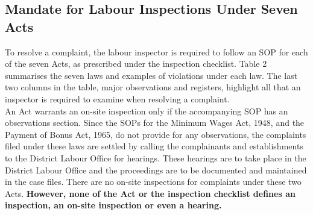 \documentclass[a4paper, 12pt, twoside]{article}
\begin{document}
\subsection{Mandate for Labour Inspections Under Seven Acts}
To resolve a complaint, the labour inspector is required to follow an SOP for each of the seven Acts, as prescribed under the inspection checklist. Table 2 summarises the seven laws and examples of violations under each law. The last two columns in the table, major observations and registers, highlight all that an inspector is required to examine when resolving a complaint. \\

An Act warrants an on-site inspection only if the accompanying SOP has an observations section. Since the SOPs for the Minimum Wages Act, 1948, and the Payment of Bonus Act, 1965, do not provide for any observations, the complaints filed under these laws are settled by calling the complainants and establishments to the District Labour Office for hearings. These hearings are to take place in the District Labour Office and the proceedings are to be documented and maintained in the case files. There are no on-site inspections for complaints under these two Acts. \textbf{However, none of the Act or the inspection checklist defines an inspection, an on-site inspection or even a hearing.} 
\end{document}
